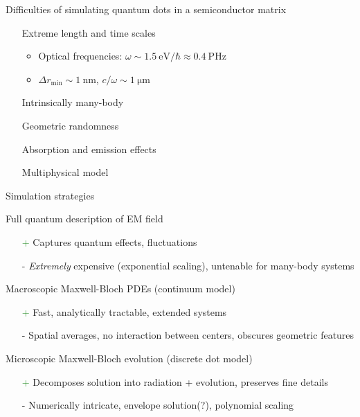 \documentclass[aspectratio=169, usenames, dvipsnames]{beamer}
\begin{document}
\begin{frame}{Difficulties of simulating quantum dots in a semiconductor matrix}
  \begin{itemize}
    \item[] Extreme length and time scales
      \begin{itemize}
        \item Optical frequencies: $\omega \sim \SI{1.5}{\eV \per \hbar} \approx \SI{0.4}{\peta\hertz}$
        \item $\Delta r_\text{min} \sim \SI{1}{\nano\meter}$, $c/\omega \sim \SI{1}{\micro\meter}$
      \end{itemize}
    \item[] Intrinsically many-body
    \item[] Geometric randomness
    \item[] Absorption and emission effects
    \item[] Multiphysical model
  \end{itemize}
\end{frame}

\begin{frame}{Simulation strategies}
  \begin{block}{Full quantum description of EM field}
    \begin{itemize}
      \item[\textcolor{ForestGreen}{+}] Captures quantum effects, fluctuations
      \item[\textcolor{BrickRed}{-}] \emph{Extremely} expensive (exponential scaling), untenable for many-body systems
    \end{itemize}
  \end{block}

  \begin{block}{Macroscopic Maxwell-Bloch PDEs (continuum model)}
    \begin{itemize}
      \item[\textcolor{ForestGreen}{+}] Fast, analytically tractable, extended systems
      \item[\textcolor{BrickRed}{-}] Spatial averages, no interaction between centers, obscures geometric features
    \end{itemize}
  \end{block}

  \begin{block}{Microscopic Maxwell-Bloch evolution (discrete dot model)}
    \begin{itemize}
      \item[\textcolor{ForestGreen}{+}] Decomposes solution into radiation + evolution, preserves fine details
      \item[\textcolor{BrickRed}{-}] Numerically intricate, envelope solution(?), polynomial scaling
    \end{itemize}
  \end{block}
\end{frame}
\end{document}
